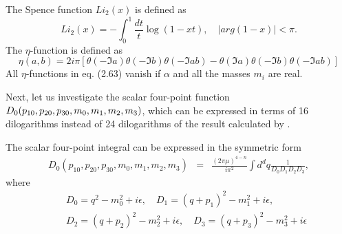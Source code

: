 The Spence function $Li_2(x)$ is defined as
\begin{equation}
Li_2(x)=-\int_{0}^{1}\frac{dt}{t}\log(1-xt),\quad |arg(1-x)|<\pi.
\end{equation}
The $\eta$-function is defined as
\begin{equation}
\eta(a,b)=2i\pi[\theta(-\Im a)\theta(-\Im b)\theta(-\Im ab)-\theta(\Im a)\theta(-\Im b)\theta(-\Im ab)]
\end{equation}
All $\eta$-functions in eq. (2.63) vanish if $\alpha$ and all the masses $m_i$ are real.

Next, let us investigate the scalar four-point function $D_0(p_{10},p_{20},p_{30},m_0,m_1\\,m_2,m_3)$, which can be expressed in terms of 16 dilogarithms \cite{s4pt} instead of 24 dilogarithms of the result calculated by \cite{tHscarlar}.

The scalar four-point integral can be expressed in the symmetric form
\begin{eqnarray}
D_0(p_{10},p_{20},p_{30},m_0,m_1,m_2,m_3)&=&\frac{{(2\pi\mu)}^{4-n}}{i\pi^2}\int d^d q\frac{1}{D_0 D_1 D_2 D_3},
\end{eqnarray}
where
\begin{eqnarray}
&&D_0=q^2-m_0^2+i\epsilon,\quad D_1=(q+p_1)^2-m_1^2+i\epsilon,\nonumber\\ &&D_2=(q+p_2)^2-m_2^2+i\epsilon,\quad D_3=(q+p_3)^2-m_3^2+i\epsilon
\end{eqnarray}

